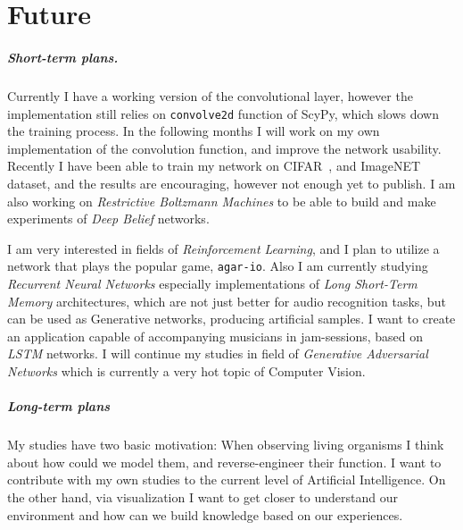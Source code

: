 \chapter{Future}

\paragraph{Short-term plans.} 
Currently I have a working version of the convolutional layer, 
however the implementation still relies on \texttt{convolve2d} function of ScyPy, which slows down the training process.
In the following months I will work on my own implementation of the convolution function, 
and improve the network usability.
Recently I have been able to train my network on CIFAR~\cite{cifar}, and ImageNET~\cite{deng2009imagenet} dataset, and the results are encouraging, however not enough yet to publish.
I am also working on \emph{Restrictive Boltzmann Machines} to be able to build and make experiments of \emph{Deep Belief} networks.

I am very interested in fields of \emph{Reinforcement Learning}, 
and I plan to utilize a network that plays the popular game, \texttt{agar-io}.
Also I am currently studying \emph{Recurrent Neural Networks} especially implementations of \emph{Long Short-Term Memory} architectures, 
which are not just better for audio recognition tasks, but can be used as Generative networks, producing artificial samples.
I want to create an application capable of accompanying musicians in jam-sessions, based on \emph{LSTM} networks.
I will continue my studies in field of \emph{Generative Adversarial Networks} which is currently a very hot topic of Computer Vision.

\paragraph{Long-term plans}
My studies have two basic motivation:
When observing living organisms I think about how could we model them, 
and reverse-engineer their function.
I want to contribute with my own studies to the current level of Artificial Intelligence.
On the other hand, via visualization I want to get closer to understand our 
environment and how can we build knowledge based on our experiences.
